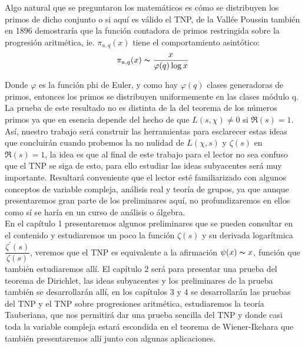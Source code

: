 Algo natural que se preguntaron los matemáticos es cómo se distribuyen los primos de dicho conjunto o si aquí es válido el TNP, de la Vallée Poussin también en 1896 demostraría que la función contadora de primos restringida sobre la progresión aritmética, ie. $\pi_{a,q}(x)$ tiene el comportamiento asintótico:\\

$$\pi_{a,q}(x)\thicksim \frac{x}{\varphi(q)\log x} $$

Donde $\varphi$ es la función phi de Euler, y como hay $\varphi(q)$ clases generadoras de primos, entonces los primos se distribuyen uniformemente en las clases módulo q.\\

La prueba de este resultado no es distinta de la del teorema de los números primos ya que en esencia depende del hecho de que $L(s,\chi)\neq 0$ si $\Re(s)=1$. Así, nuestro trabajo será construir las herramientas para esclarecer estas ideas que concluirán cuando probemos la no nulidad de $L(\chi,s)$ y $\zeta(s)$ en $\Re(s)=1$, la idea es que al final de este trabajo para el lector no sea confuso que el TNP se siga de esto, para ello estudiar las ideas subyacentes será muy importante. Resultará conveniente que el lector esté familiarizado con algunos conceptos de variable compleja, análisis real y teoría de grupos, ya que aunque presentaremos gran parte de los preliminares aquí, no profundizaremos en ellos como sí se haría en un curso de análisis o álgebra.\\

En el capítulo 1 presentaremos algunos preliminares que se pueden consultar en el contenido y estudiaremos un poco la función $\zeta(s)$ y su derivada logarítmica $\dfrac{\zeta^{\prime}(s)}{\zeta(s)}$, veremos que el TNP es equivalente a la afirmación $\psi(x)\thicksim x$, función que también estudiaremos allí. El capítulo 2 será para presentar una prueba del teorema de Dirichlet, las ideas subyacentes y los preliminares de la  prueba también se desarrollarán allí, en los capítulos 3 y 4 se desarrollarán las pruebas del TNP y el TNP sobre progresiones aritmética, estudiaremos la teoría Tauberiana, que nos permitirá dar una prueba sencilla del TNP y donde casi toda  la variable compleja estará escondida en el teorema de Wiener-Ikehara que también presentaremos allí junto con algunas aplicaciones.